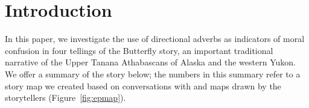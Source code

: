 



\def\authorlast{Brucks \& Lovick}

\renewcommand{\beginchapter}{\pageref{brucks-ch-begin}}
\renewcommand{\finishchapter}{\pageref{brucks-ch-end}}
\label{brucks-ch-begin}



\thispagestyle{firststyle}








\section{Introduction}
\label{section:introduction}

In this paper, we investigate the use of directional adverbs as indicators of moral confusion in four tellings of the Butterfly story, an important traditional narrative of the Upper Tanana Athabascans of Alaska and the western Yukon. We offer a summary of the story below; the numbers in this summary refer to a story map we created based on conversations with and maps drawn by the storytellers (Figure~\ref{fig:epmap}).

